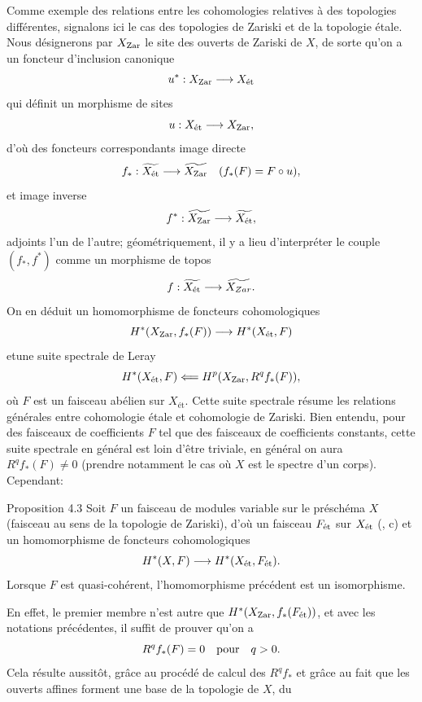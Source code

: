 \documentclass[10pt]{../fichiers-configuration-latex/smfart}
\begin{document}
\subsubsection{}

Comme exemple des relations entre les cohomologies relatives à des
topologies différentes, signalons ici le cas des topologies de Zariski
et de la topologie étale. Nous désignerons par $X_{\operatorname{Zar}}$ le site des
ouverts de Zariski de $X$, de sorte qu'on a un foncteur d'inclusion
canonique
$$
u^{\ast} : X_{\Zar} \to X_{\text{ét}}
$$
qui définit un morphisme de sites
$$
u : X_{\text{ét}} \to X_{\Zar}{\quoi},
$$
d'où des foncteurs correspondants image directe
$$
f_{\ast} : \widetilde{X_{\text{ét}}} \to \widetilde{X_{\Zar}}\quad
(f_{\ast} (F) = F \circ u){\quoi},
$$
et image inverse
$$
f^{\ast} : \widetilde{X_{\Zar}} \to \widetilde{X_{\text{ét}}}{\quoi},
$$
adjoints l'un de l'autre; géométriquement, il y a lieu d'interpréter
le couple $(f_{\ast}, f^{\ast})$ comme un morphisme de topos
$$
f : \widetilde{X_{\text{ét}}} \to \widetilde{X_{Zar}}{\quoi}.
$$
On en déduit un homomorphisme de foncteurs cohomologiques
$$
H^{\ast} (X_{\Zar}, f_{\ast} (F)) \to H^{\ast} (X_{\text{ét}}, F)
$$
et\pageoriginale une suite spectrale de Leray
$$
H^{\ast} (X_{\text{ét}}, F) \Longleftarrow H^{p} (X_{\operatorname{Zar}}, R^q
f_{\ast} (F)){},
$$
où $F$ est un faisceau abélien sur $X_{\text{ét}}$. Cette suite spectrale
résume les relations générales entre cohomologie étale et cohomologie
de Zariski. Bien entendu, pour des faisceaux de coefficients $F$ tel
que des faisceaux de coefficients constants, cette suite spectrale en
général est loin d'être triviale, \ie en général on aura $R^q f_{\ast}
(F) \neq 0$  (prendre notamment le cas où $X$ est le spectre d'un
corps). Cependant:

\begin{enonce*}{Proposition 4.3}
Soit $F$ un faisceau de modules variable sur le préschéma $X$
(faisceau au sens de la topologie de Zariski), d'où un faisceau
$F_{\text{\rm ét}}$ sur $X_{\text{\rm ét}}$ (, c) et un
homomorphisme de foncteurs cohomologiques
$$
H^{\ast} (X, F) \to H^{\ast} (X_{\text{\rm ét}}, F_{\text{\rm ét}}){\quoi}.
$$
Lorsque $F$ est quasi-cohérent, l'homomorphisme précédent est un isomorphisme.
\end{enonce*}

En effet, le premier membre n'est autre que $H^{\ast} (X_{\operatorname{Zar}},
f_{\ast} (F_{\text{ét}}))$, et avec les notations précédentes, il
suffit de prouver qu'on a
$$
R^q f_{\ast} (F) = 0\quad \mbox{pour}\quad q > 0{}.
$$
Cela résulte aussitôt, grâce au procédé de calcul des $R^q f_{\ast}$
et grâce au fait que les ouverts affines forment une base de la
topologie de $X$, du
\end{document}
